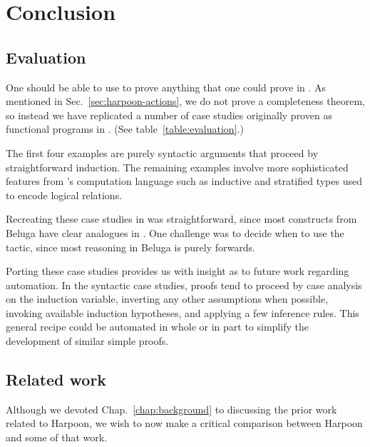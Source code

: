 \chapter{Conclusion}

\section{Evaluation}

One should be able to use \Harpoon{} to prove anything that one could prove in
\Beluga. As mentioned in Sec.~\ref{sec:harpoon-actions}, we do not prove a
completeness theorem, so instead we have replicated a number of case studies
originally proven as functional programs in \Beluga.
(See table~\ref{table:evaluation}.)

\begin{table}[h]
  \centering
  
  \caption{%
    Summary of proofs ported to \Harpoon{} from \Beluga.
  }
  \label{table:evaluation}
\end{table}

The first four examples are purely syntactic arguments that proceed by
straightforward induction.
The remaining examples involve more sophisticated features from \Beluga's
computation language such as inductive and stratified types used to encode
logical relations.

Recreating these case studies in \Harpoon{} was straightforward, since most
constructs from Beluga have clear analogues in \Harpoon.
One challenge was to decide when to use the \ttsufficess tactic, since most
reasoning in Beluga is purely forwards.

Porting these case studies provides us with insight as to future work regarding
automation.
In the syntactic case studies, proofs tend to proceed by case analysis on the
induction variable, inverting any other assumptions when possible, invoking
available induction hypotheses, and applying a few inference rules.
This general recipe could be automated in whole or in part to simplify the
development of similar simple proofs.

\section{Related work}

Although we devoted Chap.~\ref{chap:background} to discussing the prior work
related to Harpoon, we wish to now make a critical comparison between Harpoon
and some of that work.

